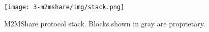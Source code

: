\begin{figure}[htpb]
  \begin{center}
    \texttt{[image: 3-m2mshare/img/stack.png]}
    \caption[M2MShare protocol stack \cite{articoloM2MShare}]{M2MShare protocol stack. Blocks shown in gray are proprietary.\cite{articoloM2MShare}}    
    \label{fig:stack-M2MShare}
  \end{center}
\end{figure}
%
%
%
